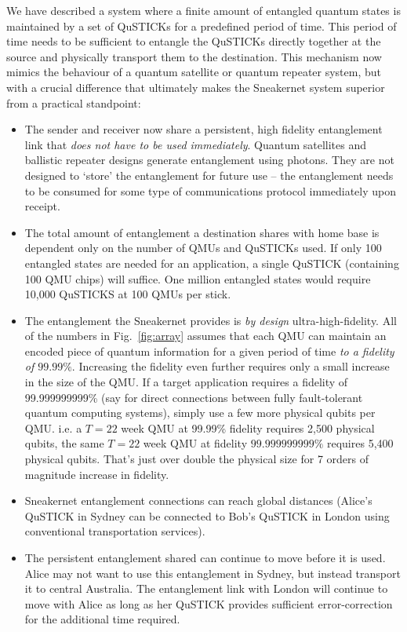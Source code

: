 \documentclass[twocolumn, aps, rmp, amsmath, amssymb, nofootinbib, superscriptaddress, longbibliography, floatfix, table-of-contents, eqsecnum]{revtex4-2}
\begin{document}
We have described a system where a finite amount of entangled quantum states is maintained by a set of QuSTICKs for a predefined period of time. This period of time needs to be sufficient to entangle the QuSTICKs directly together at the source and physically transport them to the destination. This mechanism now mimics the behaviour of a quantum satellite or quantum repeater system, but with a crucial difference that ultimately makes the Sneakernet system superior from a practical standpoint:
\begin{itemize}
\item The sender and receiver now share a persistent, high fidelity entanglement link that \textit{does not have to be used immediately}. Quantum satellites and ballistic repeater designs generate entanglement using photons. They are not designed to `store' the entanglement for future use -- the entanglement needs to be consumed for some type of communications protocol immediately upon receipt.
\item The total amount of entanglement a destination shares with home base is dependent only on the number of QMUs and QuSTICKs used. If only 100 entangled states are needed for an application, a single QuSTICK (containing 100 QMU chips) will suffice. One million entangled states would require 10,000 QuSTICKS at 100 QMUs per stick. 
\item The entanglement the Sneakernet provides is \textit{by design} ultra-high-fidelity. All of the numbers in Fig.~\ref{fig:array} assumes that each QMU can maintain an encoded piece of quantum information for a given period of time \textit{to a fidelity of $99.99\%$}. Increasing the fidelity even further requires only a small increase in the size of the QMU. If a target application requires a fidelity of 99.999999999\% (say for direct connections between fully fault-tolerant quantum computing systems), simply use a few more physical qubits per QMU. i.e. a $T= 22$ week QMU at 99.99\% fidelity requires 2,500 physical qubits, the same $T=22$ week QMU at fidelity $99.999999999\%$ requires 5,400 physical qubits. That's just over double the physical size for 7 orders of magnitude increase in fidelity.
\item Sneakernet entanglement connections can reach global distances (Alice's QuSTICK in Sydney can be connected to Bob's QuSTICK in London using conventional transportation services).
\item The persistent entanglement shared can continue to move before it is used. Alice may not want to use this entanglement in Sydney, but instead transport it to central Australia. The entanglement link with London will continue to move with Alice as long as her QuSTICK provides sufficient error-correction for the additional time required.
\end{itemize}
\end{document}
